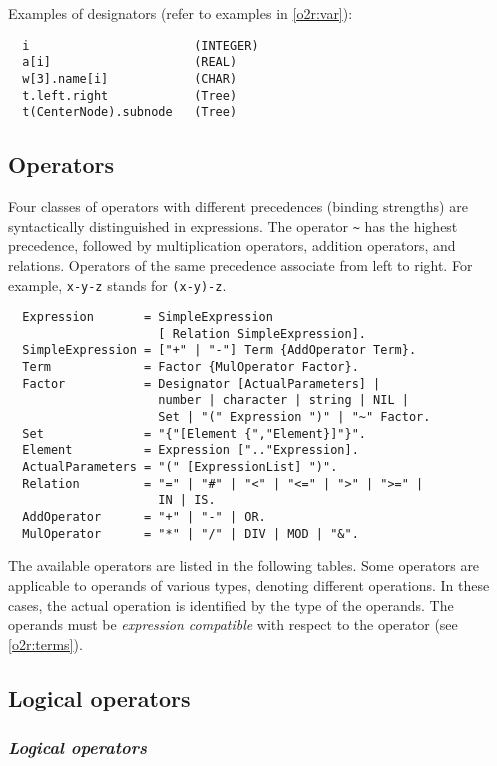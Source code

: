 \noindent
Examples of designators (refer to examples in \ref{o2r:var}):
\begin{verbatim}
  i                       (INTEGER)
  a[i]                    (REAL)
  w[3].name[i]            (CHAR)
  t.left.right            (Tree)
  t(CenterNode).subnode   (Tree)
\end{verbatim}

\subsection{Operators}\label{o2r:operators}

Four classes of operators with different precedences (binding strengths)
are syntactically distinguished in expressions. The operator \verb|~| has
the highest precedence, followed by multiplication operators, addition
operators, and relations. Operators of the same precedence associate
from left to right. For example, \verb|x-y-z| stands for \verb|(x-y)-z|.
{\BNFsize
\begin{verbatim}
  Expression       = SimpleExpression
                     [ Relation SimpleExpression].
  SimpleExpression = ["+" | "-"] Term {AddOperator Term}.
  Term             = Factor {MulOperator Factor}.
  Factor           = Designator [ActualParameters] |
                     number | character | string | NIL |
                     Set | "(" Expression ")" | "~" Factor.
  Set              = "{"[Element {","Element}]"}".
  Element          = Expression [".."Expression].
  ActualParameters = "(" [ExpressionList] ")".
  Relation         = "=" | "#" | "<" | "<=" | ">" | ">=" |
                     IN | IS.
  AddOperator      = "+" | "-" | OR.
  MulOperator      = "*" | "/" | DIV | MOD | "&".
\end{verbatim}}

\noindent
The available operators are listed in the following tables. Some operators
are applicable to operands of various types, denoting different operations.
In these cases, the actual operation is identified by the type of
the operands. The operands must be {\em expression compatible} with
respect to the operator (see \ref{o2r:terms}).

\ifonline
\subsection{Logical operators}
\else
\subsubsection{\em Logical operators}
\fi

